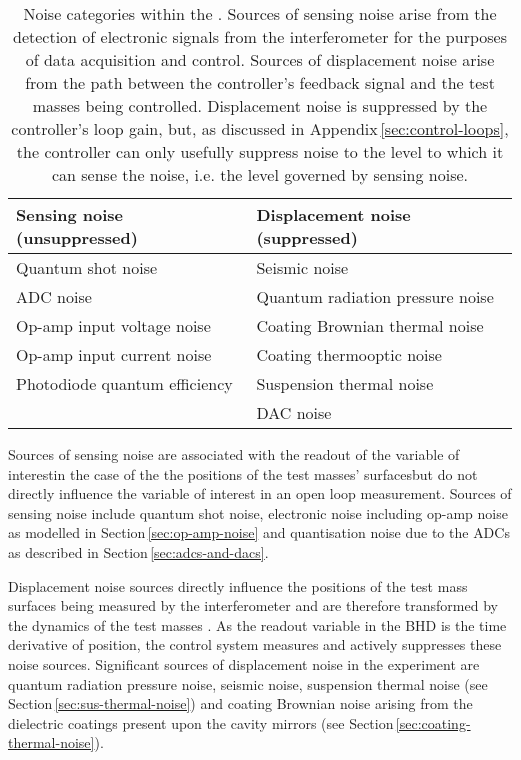 \begin{table}
  \centering
  \begin{tabular}{l|l}
    \textbf{Sensing noise (unsuppressed)}        & \textbf{Displacement noise (suppressed)} \\
    \hline
    Quantum shot noise            & Seismic noise \\
    \gls{ADC} noise               & Quantum radiation pressure noise \\
    Op-amp input voltage noise    & Coating Brownian thermal noise \\
    Op-amp input current noise    & Coating thermooptic noise \\
    Photodiode quantum efficiency & Suspension thermal noise \\
                                  & \gls{DAC} noise \\
  \end{tabular}
  \caption[Noise categories within the \SSMEXPT{}]{\label{tab:noise-categories}Noise categories within the \SSMEXPT{}. Sources of sensing noise arise from the detection of electronic signals from the interferometer for the purposes of data acquisition and control. Sources of displacement noise arise from the path between the controller's feedback signal and the test masses being controlled. Displacement noise is suppressed by the controller's loop gain, but, as discussed in Appendix\,\ref{sec:control-loops}, the controller can only usefully suppress noise to the level to which it can sense the noise, i.e. the level governed by sensing noise.}
\end{table}

Sources of sensing noise are associated with the readout of the variable of interest\textemdash in the case of the \SSM{} the positions of the test masses' surfaces\textemdash but do not directly influence the variable of interest in an open loop measurement. Sources of sensing noise include quantum shot noise, electronic noise including op-amp noise as modelled in Section\,\ref{sec:op-amp-noise} and quantisation noise due to the \glspl{ADC} as described in Section\,\ref{sec:adcs-and-dacs}.

Displacement noise sources directly influence the positions of the test mass surfaces being measured by the interferometer and are therefore transformed by the dynamics of the test masses \cite{Danilishin2015}. As the readout variable in the \gls{BHD} is the time derivative of position, the control system measures and actively suppresses these noise sources. Significant sources of displacement noise in the \SSM{} experiment are quantum radiation pressure noise, seismic noise, suspension thermal noise (see Section\,\ref{sec:sus-thermal-noise}) and coating Brownian noise arising from the dielectric coatings present upon the cavity mirrors (see Section\,\ref{sec:coating-thermal-noise}).

